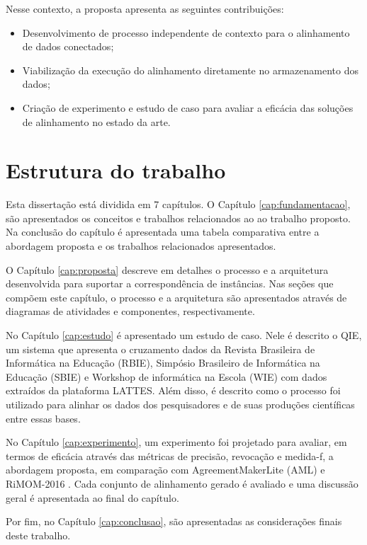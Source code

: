 Nesse contexto, a proposta apresenta as seguintes contribuições:
\begin{itemize}
\item Desenvolvimento de processo independente de contexto para o alinhamento de dados conectados;
\item Viabilização da execução do alinhamento diretamente no armazenamento dos dados;
\item  Criação de experimento e estudo de caso para avaliar a eficácia das soluções de alinhamento no estado da arte.
\end{itemize}

\section{Estrutura do trabalho}

Esta dissertação está dividida em 7 capítulos. O Capítulo \ref{cap:fundamentacao}, são apresentados os conceitos e trabalhos relacionados ao ao trabalho proposto. Na conclusão do capítulo é apresentada uma tabela comparativa entre a abordagem proposta e os trabalhos relacionados apresentados.



O Capítulo \ref{cap:proposta} descreve em detalhes o processo e a arquitetura desenvolvida para suportar a correspondência de instâncias. Nas seções que compõem este capítulo, o processo e a arquitetura são apresentados através de diagramas de atividades e componentes, respectivamente.

No Capítulo \ref{cap:estudo} é apresentado um estudo de caso. Nele é descrito o QIE, um sistema que apresenta o cruzamento dados da Revista Brasileira de Informática na Educação (RBIE), Simpósio Brasileiro de Informática na Educação (SBIE) e Workshop de informática na Escola (WIE) com dados extraídos da plataforma LATTES. Além disso, é descrito como o processo foi utilizado para alinhar os dados dos pesquisadores e de suas produções científicas entre essas bases.

No Capítulo \ref{cap:experimento}, um experimento foi projetado para avaliar, em termos de eficácia através das métricas de precisão, revocação e medida-f, a abordagem proposta, em comparação com AgreementMakerLite (AML) \cite{fariaoaei} e RiMOM-2016 \cite{zhang2016rimom}. Cada conjunto de alinhamento gerado é avaliado e uma discussão geral é apresentada ao final do capítulo.

Por fim, no Capítulo \ref{cap:conclusao}, são apresentadas as considerações finais deste trabalho.

